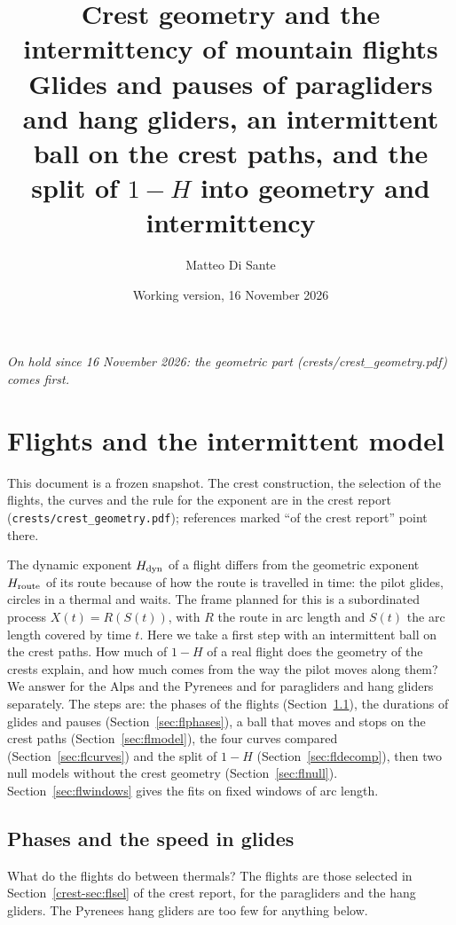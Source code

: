 \documentclass[11pt,a4paper]{article}
\title{\textbf{Crest geometry and the intermittency of mountain flights}\\[4pt]
  \large Glides and pauses of paragliders and hang gliders, an intermittent ball on the crest paths, and the split of
  $1-H$ into geometry and intermittency}
\author{Matteo Di Sante}
\date{Working version, 16 November 2026}
\newcommand{\code}[1]{\texttt{#1}}
\begin{document}
\maketitle

\noindent\emph{On hold since 16 November 2026: the geometric part (crests/crest\_geometry.pdf) comes first.}

\tableofcontents

\section{Flights and the intermittent model}\label{sec:flights}

This document is a frozen snapshot. The crest construction, the selection of the flights, the curves and the rule for
the exponent are in the crest report (\code{crests/crest\_geometry.pdf}); references marked ``of the crest report''
point there.

The dynamic exponent $H_{\mathrm{dyn}}$ of a flight differs from the geometric exponent $H_{\mathrm{route}}$ of its route because of how the
route is travelled in time: the pilot glides, circles in a thermal and waits. The frame planned for this is a
subordinated process $X(t) = R(S(t))$, with $R$ the route in arc length and $S(t)$ the arc length covered by time $t$.
Here we take a first step with an intermittent ball on the crest paths. How much of $1-H$ of a real flight does the
geometry of the crests explain, and how much comes from the way the pilot moves along them? We answer for the Alps and
the Pyrenees and for paragliders and hang gliders separately. The steps are: the phases of the flights
(Section~\ref{sec:flsel}), the durations of glides and pauses (Section~\ref{sec:flphases}), a ball that moves and stops
on the crest paths (Section~\ref{sec:flmodel}), the four curves compared (Section~\ref{sec:flcurves}) and the split of
$1-H$ (Section~\ref{sec:fldecomp}), then two null models without the crest geometry (Section~\ref{sec:flnull}).
Section~\ref{sec:flwindows} gives the fits on fixed windows of arc length.

\subsection{Phases and the speed in glides}\label{sec:flsel}

What do the flights do between thermals? The flights are those selected in Section~\ref{crest-sec:flsel} of the crest
report, for the paragliders and the hang gliders. The Pyrenees hang gliders are too few for anything below.
\end{document}
